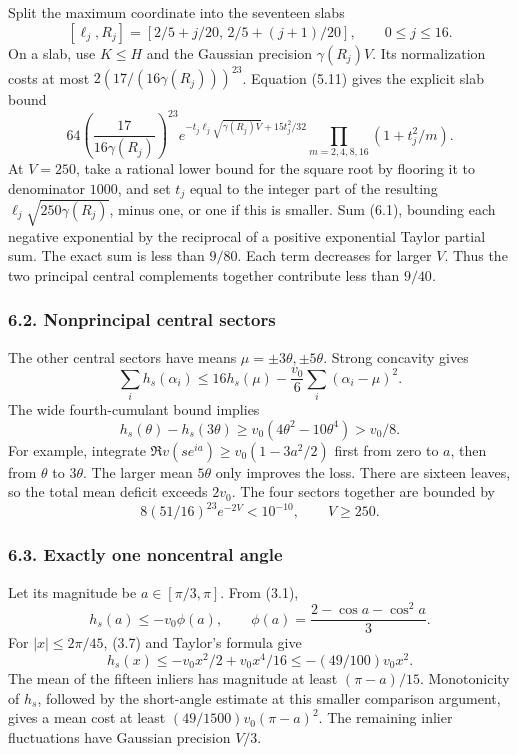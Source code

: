 \documentclass[
  11pt,
]{article}
\begin{document}
Split the maximum coordinate into the seventeen slabs \[
 [\ell_j,R_j]=[2/5+j/20,\,2/5+(j+1)/20],\qquad0\le j\le16.
\] On a slab, use \(K\le H\) and the Gaussian precision
\(\gamma(R_j)V\). Its normalization costs at most
\(2(17/(16\gamma(R_j)))^{23}\). Equation (5.11) gives the explicit slab
bound \[
 64\left(\frac{17}{16\gamma(R_j)}\right)^{23}
 e^{-t_j\ell_j\sqrt{\gamma(R_j)V}+15t_j^2/32}
 \prod_{m=2,4,8,16}(1+t_j^2/m).                               \tag{6.1}
\] At \(V=250\), take a rational lower bound for the square root by
flooring it to denominator \(1000\), and set \(t_j\) equal to the
integer part of the resulting \(\ell_j\sqrt{250\gamma(R_j)}\), minus
one, or one if this is smaller. Sum (6.1), bounding each negative
exponential by the reciprocal of a positive exponential Taylor partial
sum. The exact sum is less than \(9/80\). Each term decreases for larger
\(V\). Thus the two principal central complements together contribute
less than \(9/40\).

\subsubsection{6.2. Nonprincipal central
sectors}\label{nonprincipal-central-sectors}

The other central sectors have means \(\mu=\pm3\theta,\pm5\theta\).
Strong concavity gives \[
 \sum_i h_s(\alpha_i)
 \le16h_s(\mu)-\frac{v_0}{6}\sum_i(\alpha_i-\mu)^2.
\] The wide fourth-cumulant bound implies \[
 h_s(\theta)-h_s(3\theta)
 \ge v_0(4\theta^2-10\theta^4)>v_0/8.
\] For example, integrate \(\Re v(se^{ia})\ge v_0(1-3a^2/2)\) first from
zero to \(a\), then from \(\theta\) to \(3\theta\). The larger mean
\(5\theta\) only improves the loss. There are sixteen leaves, so the
total mean deficit exceeds \(2v_0\). The four sectors together are
bounded by \[
 8(51/16)^{23}e^{-2V}<10^{-10},\qquad V\ge250.                 \tag{6.2}
\]

\subsubsection{6.3. Exactly one noncentral
angle}\label{exactly-one-noncentral-angle}

Let its magnitude be \(a\in[\pi/3,\pi]\). From (3.1), \[
 h_s(a)\le-v_0\phi(a),\qquad
 \phi(a)=\frac{2-\cos a-\cos^2a}{3}.
\] For \(|x|\le2\pi/45\), (3.7) and Taylor's formula give \[
 h_s(x)\le-v_0x^2/2+v_0x^4/16\le-(49/100)v_0x^2.
\] The mean of the fifteen inliers has magnitude at least
\((\pi-a)/15\). Monotonicity of \(h_s\), followed by the short-angle
estimate at this smaller comparison argument, gives a mean cost at least
\((49/1500)v_0(\pi-a)^2\). The remaining inlier fluctuations have
Gaussian precision \(V/3\).
\end{document}
